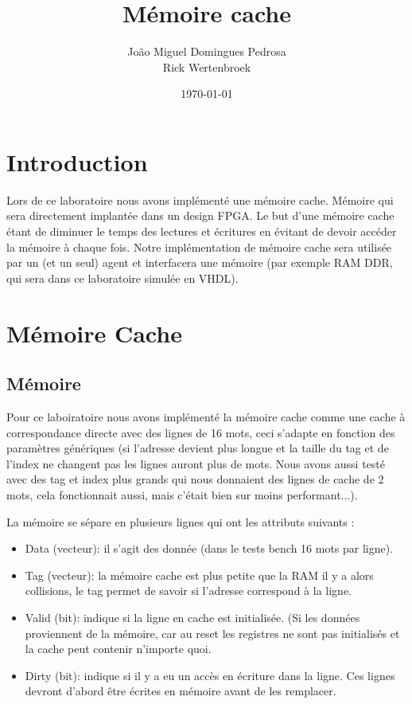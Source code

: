 \documentclass[10pt,a4paper]{article}
\author{João Miguel Domingues Pedrosa\\Rick Wertenbroek}
\title{Mémoire cache}
\date{\today}
\begin{document}
\maketitle
\newpage
\tableofcontents
\newpage

\section{Introduction}
Lors de ce laboratoire nous avons implémenté une mémoire cache. Mémoire qui sera directement implantée dans un design FPGA. Le but d'une mémoire cache étant de diminuer le temps des lectures et écritures en évitant de devoir accéder la mémoire à chaque fois. Notre implémentation de mémoire cache sera utilisée par un (et un seul) agent et interfacera une mémoire (par exemple RAM DDR, qui sera dans ce laboratoire simulée en VHDL).

\section{Mémoire Cache}
\subsection{Mémoire}
Pour ce laboiratoire nous avons implémenté la mémoire cache comme une cache à correspondance directe avec des lignes de 16 mots, ceci s'adapte en fonction des paramètres génériques (si l'adresse devient plus longue et la taille du tag et de l'index ne changent pas les lignes auront plus de mots. Nous avons aussi testé avec des tag et index plus grands qui nous donnaient des lignes de cache de 2 mots, cela fonctionnait aussi, mais c'était bien sur moins performant...).

La mémoire se sépare en plusieurs lignes qui ont les attributs suivants :\\

\begin{itemize}
	\item Data (vecteur): il s'agit des donnée (dans le tests bench 16 mots par ligne).
	\item Tag  (vecteur): la mémoire cache est plus petite que la RAM il y a alors collisions, le tag permet de savoir si l'adresse correspond à la ligne.
	\item Valid (bit): indique si la ligne en cache est initialisée. (Si les données proviennent de la mémoire, car au reset les registres ne sont pas initialisés et la cache peut contenir n'importe quoi.
	\item Dirty (bit): indique si il y a eu un accès en écriture dans la ligne. Ces lignes devront d'abord être écrites en mémoire avant de les remplacer.\\
\end{itemize}
\end{document}
